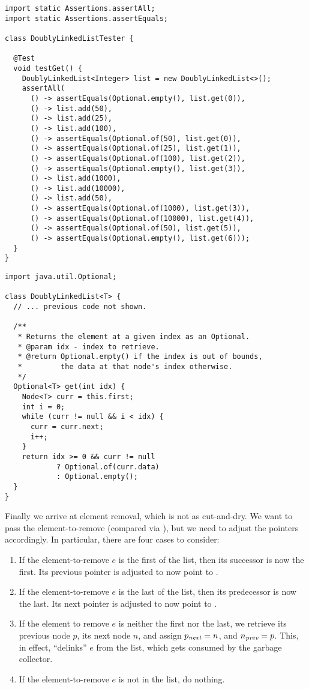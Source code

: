 \begin{lstlisting}[language=MyJava]
import static Assertions.assertAll;
import static Assertions.assertEquals;

class DoublyLinkedListTester {

  @Test
  void testGet() {
    DoublyLinkedList<Integer> list = new DoublyLinkedList<>();
    assertAll(
      () -> assertEquals(Optional.empty(), list.get(0)),
      () -> list.add(50),
      () -> list.add(25),
      () -> list.add(100),
      () -> assertEquals(Optional.of(50), list.get(0)),
      () -> assertEquals(Optional.of(25), list.get(1)),
      () -> assertEquals(Optional.of(100), list.get(2)),
      () -> assertEquals(Optional.empty(), list.get(3)),
      () -> list.add(1000),
      () -> list.add(10000),
      () -> list.add(50),
      () -> assertEquals(Optional.of(1000), list.get(3)),
      () -> assertEquals(Optional.of(10000), list.get(4)),
      () -> assertEquals(Optional.of(50), list.get(5)),
      () -> assertEquals(Optional.empty(), list.get(6)));
  }
}
\end{lstlisting}

\begin{lstlisting}[language=MyJava]
import java.util.Optional;

class DoublyLinkedList<T> {
  // ... previous code not shown.

  /**
   * Returns the element at a given index as an Optional.
   * @param idx - index to retrieve.
   * @return Optional.empty() if the index is out of bounds,
   *         the data at that node's index otherwise.
   */
  Optional<T> get(int idx) {
    Node<T> curr = this.first;
    int i = 0;
    while (curr != null && i < idx) {
      curr = curr.next;
      i++;
    }
    return idx >= 0 && curr != null
            ? Optional.of(curr.data)
            : Optional.empty();
  }
}
\end{lstlisting}

Finally we arrive at element removal, which is not as cut-and-dry. We want to pass the element-to-remove (compared via ), but we need to adjust the pointers accordingly. In particular, there are four cases to consider:

\begin{enumerate}[label=(\alph*)]
  \item If the element-to-remove $e$ is the first of the list, then its successor is now the first. Its previous pointer is adjusted to now point to .
  \item If the element-to-remove $e$ is the last of the list, then its predecessor is now the last. Its next pointer is adjusted to now point to .
  \item If the element to remove $e$ is neither the first nor the last, we retrieve its previous node $p$, its next node $n$, and assign $p_\emph{next} = n$, and $n_\emph{prev} = p$. This, in effect, ``delinks'' $e$ from the list, which gets consumed by the garbage collector.
  \item If the element-to-remove $e$ is not in the list, do nothing.
\end{enumerate}


